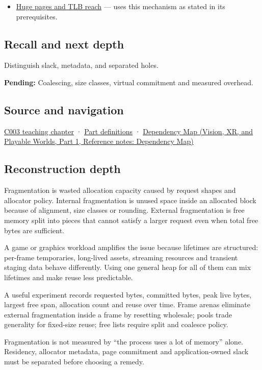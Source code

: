 \begin{itemize}
\tightlist
\item
  \hyperref[appendix-ce688d1acdab]{Huge pages and TLB reach} --- uses this mechanism as stated in its prerequisites.
\end{itemize}

\subsection{Recall and next depth}\label{appendix-a7c50686d81f-recall-and-next-depth}

\hypertarget{appendix-a7c50686d81f-recall-and-next-depth}{}

Distinguish slack, metadata, and separated holes.

\textbf{Pending:} Coalescing, size classes, virtual commitment and measured overhead.

\subsection{Source and navigation}\label{appendix-a7c50686d81f-source-and-navigation}

\hypertarget{appendix-a7c50686d81f-source-and-navigation}{}

\hyperref[01-foundations-i-ch002-where-the-bytes-live]{C003 teaching chapter} · \hyperref[appendix-fd090d982a15-m003---parts-41-60]{Part definitions} · \href{../07-Vision-XR-and-Playable-Worlds-P01/main.pdf\#appendix-4ad47bdd269a}{Dependency Map (Vision, XR, and Playable Worlds, Part 1, Reference notes: Dependency Map)}

\subsection{Reconstruction depth}\label{appendix-a7c50686d81f-reconstruction-depth}

\hypertarget{appendix-a7c50686d81f-reconstruction-depth}{}

Fragmentation is wasted allocation capacity caused by request shapes and allocator policy. Internal fragmentation is unused space inside an allocated block because of alignment, size classes or rounding. External fragmentation is free memory split into pieces that cannot satisfy a larger request even when total free bytes are sufficient.

A game or graphics workload amplifies the issue because lifetimes are structured: per-frame temporaries, long-lived assets, streaming resources and transient staging data behave differently. Using one general heap for all of them can mix lifetimes and make reuse less predictable.

A useful experiment records requested bytes, committed bytes, peak live bytes, largest free span, allocation count and reuse over time. Frame arenas eliminate external fragmentation inside a frame by resetting wholesale; pools trade generality for fixed-size reuse; free lists require split and coalesce policy.

Fragmentation is not measured by ``the process uses a lot of memory'' alone. Residency, allocator metadata, page commitment and application-owned slack must be separated before choosing a remedy.
